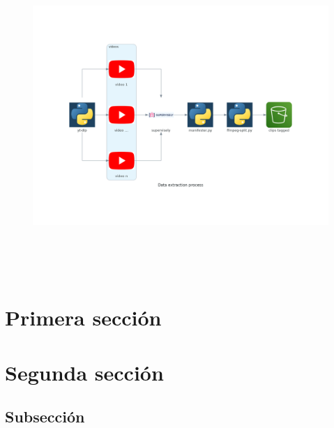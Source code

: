 \begin{figure}[H]
    \centering
		\includegraphics[height=12cm, width=18cm]{figs/data_extraction_process.png}
\end{figure}


\section{Primera sección}
\lipsum[1-5]
\section{Segunda sección}
\lipsum[1-5]
\subsection{Subsección}
\lipsum[1-6]

